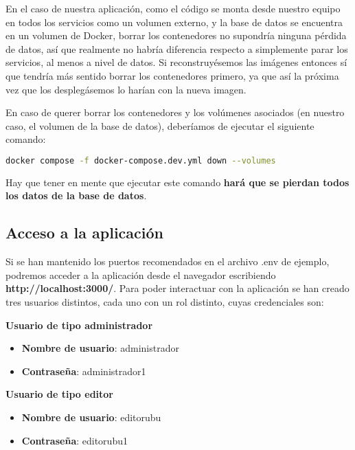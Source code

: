 En el caso de nuestra aplicación, como el código se monta desde nuestro equipo en todos los servicios como un volumen externo, y la base de datos se encuentra en un volumen de Docker, borrar los contenedores no supondría ninguna pérdida de datos, así que realmente no habría diferencia respecto a simplemente parar los servicios, al menos a nivel de datos. Si reconstruyésemos las imágenes entonces sí que tendría más sentido borrar los contenedores primero, ya que así la próxima vez que los desplegásemos lo harían con la nueva imagen.


En caso de querer borrar los contenedores y los volúmenes asociados (en nuestro caso, el volumen de la base de datos), deberíamos de ejecutar el siguiente comando:

\begin{lstlisting}[language=Bash]
  docker compose -f docker-compose.dev.yml down --volumes
\end{lstlisting}


Hay que tener en mente que ejecutar este comando \textbf{hará que se pierdan todos los datos de la base de datos}.

\subsection{Acceso a la aplicación}

Si se han mantenido los puertos recomendados en el archivo .env de ejemplo, podremos acceder a la aplicación desde el navegador escribiendo \textbf{http://localhost:3000/}. Para poder interactuar con la aplicación se han creado tres usuarios distintos, cada uno con un rol distinto, cuyas credenciales son:

\textbf{Usuario de tipo administrador}
\begin{itemize}
	\item \textbf{Nombre de usuario}: administrador
	\item \textbf{Contraseña}: administrador1	
\end{itemize}

\textbf{Usuario de tipo editor}
\begin{itemize}
	\item \textbf{Nombre de usuario}: editorubu
	\item \textbf{Contraseña}: editorubu1	
\end{itemize}

